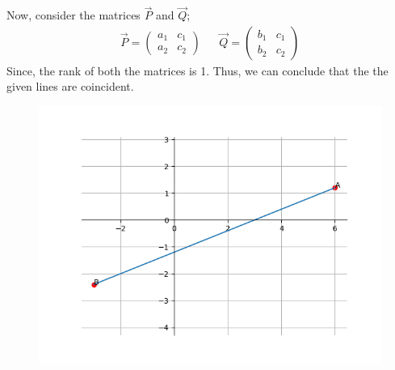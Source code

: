\documentclass{beamer}
\theoremstyle{remark}
\newcommand{\myvec}[1]{\ensuremath{\begin{pmatrix}#1\end{pmatrix}}}
\numberwithin{equation}{section}
\begin{document}
\begin{frame}
Now, consider the matrices $\Vec{P}$ and $\Vec{Q}$;
\begin{align}
\Vec{P}=\myvec{a_1 & c_1 \\ a_2 & c_2} && \Vec{Q}=\myvec{b_1 & c_1 \\ b_2 & c_2}
\end{align}
Since, the rank of both the matrices is 1. Thus, we can conclude that the the given lines are coincident.

\begin{figure}[H]
\centering
\includegraphics[width=0.6\columnwidth]{figs/img.png}
\caption*{}
\end{figure}
\end{frame}
\end{document}
